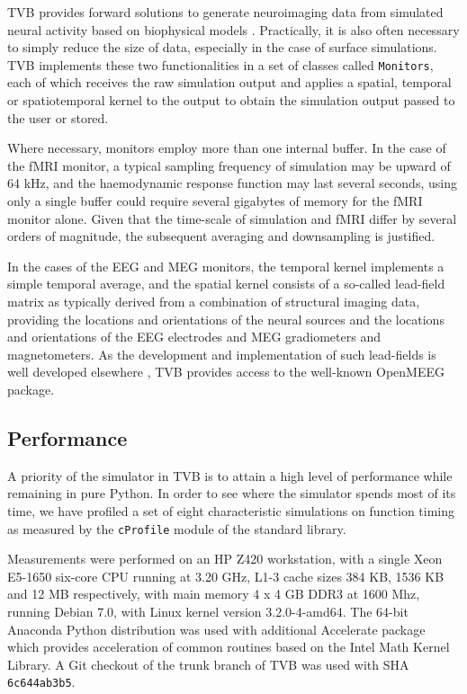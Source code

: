 \documentclass{bioinfo}
\begin{document}
	TVB provides forward solutions to generate neuroimaging data from 
	simulated neural activity based on biophysical models 
	\citep{Buxton_2004, Jirsa_2002}. Practically, it is also often
	necessary to simply reduce the size of data, especially in the case of 
	surface simulations. TVB implements these two functionalities in
	a set of classes called \texttt{Monitors}, each of which receives
	the raw simulation output and applies a spatial, temporal or spatiotemporal
	kernel to the output to obtain the simulation output passed to the
	user or stored. 

	Where necessary, monitors employ more than one internal buffer. In the case of 
	the fMRI monitor, a typical sampling frequency of simulation may be upward of 
	64 kHz, and the haemodynamic response function may last several seconds, 
	using only a single buffer could require several gigabytes of memory for the 
	fMRI monitor alone. Given that 
	the time-scale of simulation and fMRI differ by several orders of magnitude, 
	the subsequent averaging and downsampling is justified. 

	In the cases of the EEG and MEG monitors, the temporal kernel implements a simple
	temporal average, and the spatial kernel consists of a so-called lead-field matrix as typically
	derived from a combination of structural imaging data, 
	providing the locations and orientations of the neural sources and the locations
	and orientations of the EEG electrodes and MEG gradiometers and magnetometers. 
	As the development and implementation of such lead-fields is well developed
	elsewhere \citep{Sarvas_1987,Hamalainen_1989,Jirsa_2002,Nolte2003,Gramfort_2010}, 
	TVB provides access to the well-known OpenMEEG package.

\subsection{Performance}

	A priority of the simulator in TVB is to attain a high level of performance
	while remaining in pure Python. In order to see where the simulator 
	spends most of its time, we have profiled 
	a set of eight characteristic simulations
    	on function timing as measured by the 
	\texttt{cProfile} module of the standard library. 
	
	Measurements were
	performed on an HP Z420 workstation, with a single Xeon E5-1650
	six-core CPU running at 3.20 GHz, L1-3 cache sizes 384 KB, 1536 KB
	and 12 MB respectively, with main memory 4 x 4 GB DDR3 at 1600 Mhz,
	running Debian 7.0, with Linux kernel version 3.2.0-4-amd64. 
	The 64-bit Anaconda Python distribution was used with additional Accelerate
	package which provides acceleration of common routines based on the 
	Intel Math Kernel Library. A Git checkout of the trunk branch of TVB 
	was used with SHA \texttt{6c644ab3b5}.
\end{document}
